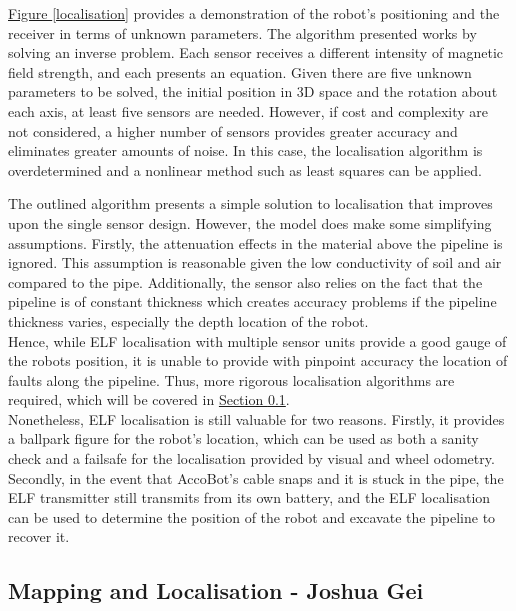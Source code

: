 \documentclass[11pt]{article}		%
\newcommand{\figref}[1]{\hyperref[#1]{Figure \ref*{#1}}}    %
\newcommand{\sectref}[1]{\hyperref[#1]{Section \ref*{#1}}}     %
\begin{document}
			\hspace*{2ex} \figref{localisation} provides a demonstration of the robot's positioning and the receiver in terms of unknown parameters. The algorithm presented works by solving an inverse problem. Each sensor receives a different intensity of magnetic field strength, and each presents an equation. Given there are five unknown parameters to be solved, the initial position in 3D space and the rotation about each axis, at least five sensors are needed. However, if cost and complexity are not considered, a higher number of sensors provides greater accuracy and eliminates greater amounts of noise. In this case, the localisation algorithm is overdetermined and a nonlinear method such as least squares can be applied.
		    \begin{floatingfigure}[r]{0pt} \end{floatingfigure}
            \hspace*{2ex}The outlined algorithm presents a simple solution to localisation that improves upon the single sensor design. However, the model does make some simplifying assumptions. Firstly, the attenuation effects in the material above the pipeline is ignored. This assumption is reasonable given the low conductivity of soil and air compared to the pipe. Additionally, the sensor also relies on the fact that the pipeline is of constant thickness which creates accuracy problems if the pipeline thickness varies, especially the depth location of the robot. 
			\\
			\hspace*{2ex}Hence, while ELF localisation with multiple sensor units provide a good gauge of the robots position, it is unable to provide with pinpoint accuracy the location of faults along the pipeline. Thus, more rigorous localisation algorithms are required, which will be covered in \sectref{localisationSection}.
			\\
			\hspace*{2ex}Nonetheless, ELF localisation is still valuable for two reasons. Firstly, it provides a ballpark figure for the robot's location, which can be used as both a sanity check and a failsafe for the localisation provided by visual and wheel odometry.  Secondly, in the event that AccoBot's cable snaps and it is stuck in the pipe, the ELF transmitter still transmits from its own battery, and the ELF localisation can be used to determine the position of the robot and excavate the pipeline to recover it. 
			
		\subsection[Mapping and Localisation]{Mapping and Localisation - Joshua Gei} \label{localisationSection}
		
\end{document}
